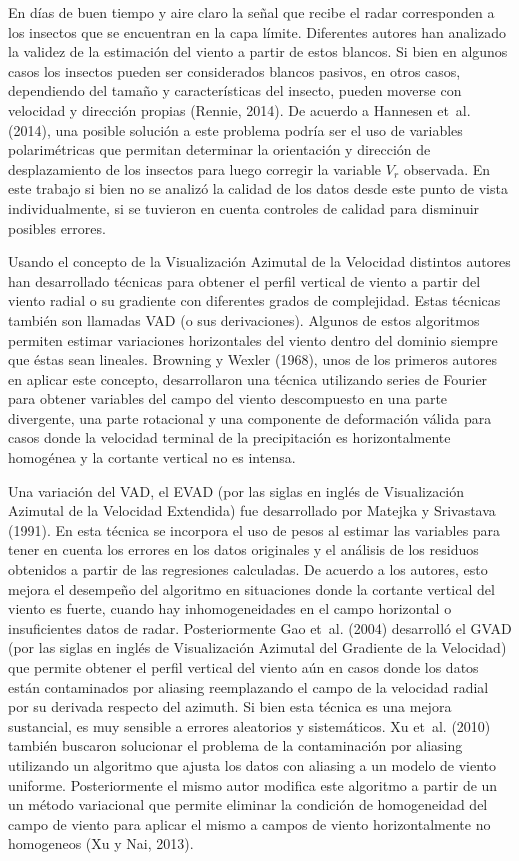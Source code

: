 \documentclass[12pt,spanish,oneside, a4paper]{book}
\begin{document}
En días de buen tiempo y aire claro la señal que recibe el radar
corresponden a los insectos que se encuentran en la capa límite.
Diferentes autores han analizado la validez de la estimación del viento
a partir de estos blancos. Si bien en algunos casos los insectos pueden
ser considerados blancos pasivos, en otros casos, dependiendo del tamaño
y características del insecto, pueden moverse con velocidad y dirección
propias (Rennie, 2014). De acuerdo a Hannesen et~al. (2014), una posible
solución a este problema podría ser el uso de variables polarimétricas
que permitan determinar la orientación y dirección de desplazamiento de
los insectos para luego corregir la variable \(V_r\) observada. En este
trabajo si bien no se analizó la calidad de los datos desde este punto
de vista individualmente, si se tuvieron en cuenta controles de calidad
para disminuir posibles errores.

Usando el concepto de la Visualización Azimutal de la Velocidad
distintos autores han desarrollado técnicas para obtener el perfil
vertical de viento a partir del viento radial o su gradiente con
diferentes grados de complejidad. Estas técnicas también son llamadas
VAD (o sus derivaciones). Algunos de estos algoritmos permiten estimar
variaciones horizontales del viento dentro del dominio siempre que éstas
sean lineales. Browning y Wexler (1968), unos de los primeros autores en
aplicar este concepto, desarrollaron una técnica utilizando series de
Fourier para obtener variables del campo del viento descompuesto en una
parte divergente, una parte rotacional y una componente de deformación
válida para casos donde la velocidad terminal de la precipitación es
horizontalmente homogénea y la cortante vertical no es intensa.

Una variación del VAD, el EVAD (por las siglas en inglés de
Visualización Azimutal de la Velocidad Extendida) fue desarrollado por
Matejka y Srivastava (1991). En esta técnica se incorpora el uso de
pesos al estimar las variables para tener en cuenta los errores en los
datos originales y el análisis de los residuos obtenidos a partir de las
regresiones calculadas. De acuerdo a los autores, esto mejora el
desempeño del algoritmo en situaciones donde la cortante vertical del
viento es fuerte, cuando hay inhomogeneidades en el campo horizontal o
insuficientes datos de radar. Posteriormente Gao et~al. (2004)
desarrolló el GVAD (por las siglas en inglés de Visualización Azimutal
del Gradiente de la Velocidad) que permite obtener el perfil vertical
del viento aún en casos donde los datos están contaminados por aliasing
reemplazando el campo de la velocidad radial por su derivada respecto
del azimuth. Si bien esta técnica es una mejora sustancial, es muy
sensible a errores aleatorios y sistemáticos. Xu et~al. (2010) también
buscaron solucionar el problema de la contaminación por aliasing
utilizando un algoritmo que ajusta los datos con aliasing a un modelo de
viento uniforme. Posteriormente el mismo autor modifica este algoritmo a
partir de un un método variacional que permite eliminar la condición de
homogeneidad del campo de viento para aplicar el mismo a campos de
viento horizontalmente no homogeneos (Xu y Nai, 2013).
\end{document}
